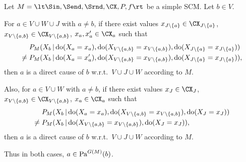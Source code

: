 \begin{Cor}\label{cor:scm_identify_direct_causal_relation}
  Let $M = \lt \Sin, \Send, \Srnd, \CX, P, f \rt$ be a simple SCM.
  Let $b \in V$.

  For $a \in V \cup W \cup J$ with $a \ne b$, if there exist values $x_{J\setminus\{a\}} \in \CX_{J\sm\{a\}}$, $x_{V\setminus\{a,b\}} \in \CX_{V\setminus\{a,b\}}$, $x_a,x_a' \in \CX_a$ such that
      \begin{equation*}\begin{split}
        & P_{M}(X_b \operatorname*{|} \operatorname{do}(X_a=x_a),\operatorname{do}(X_{V\setminus\{a,b\}}=x_{V\setminus\{a,b\}}),\operatorname{do}(X_{J\setminus \{a\}}=x_{J\setminus \{a\}})) \\
        {} \ne {} & P_{M}(X_b \operatorname*{|} \operatorname{do}(X_a=x_a'),\operatorname{do}(X_{V\setminus\{a,b\}}=x_{V\setminus\{a,b\}}),\operatorname{do}(X_{J\setminus\{a\}}=x_{J\setminus\{a\}})),
      \end{split}\end{equation*}
  then $a$ is a direct cause of $b$ w.r.t.\ $V \cup J \cup W$ according to $M$.

  Also, for $a \in V \cup W$ with $a \ne b$, if there exist values $x_J \in \CX_J$, $x_{V\setminus\{a,b\}} \in \CX_{V\setminus\{a,b\}}$, $x_a \in \CX_a$ such that
      \begin{equation*}\begin{split}
        & P_{M}(X_b \operatorname*{|} \operatorname{do}(X_a=x_a),\operatorname{do}(X_{V\setminus\{a,b\}}=x_{V\setminus\{a,b\}}),\operatorname{do}(X_J=x_J)) \\
        {} \ne {} & P_{M}(X_b \operatorname*{|} \operatorname{do}(X_{V\setminus\{a,b\}}=x_{V\setminus\{a,b\}}),\operatorname{do}(X_J=x_J)),
      \end{split}\end{equation*}
  then $a$ is a direct cause of $b$ w.r.t.\ $V \cup J \cup W$ according to $M$.
  
  Thus in both cases, $a \in \mathrm{Pa}^{G(M)}(b)$.
\end{Cor}
